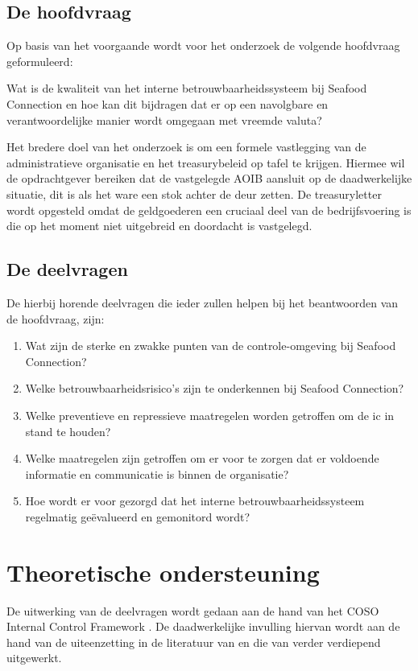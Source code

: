 \newpage

\subsection{De hoofdvraag}
Op basis van het voorgaande wordt voor het onderzoek de volgende hoofdvraag geformuleerd:

\bigskip

\noindent
\begin{center}
\textnormal{\large{Wat is de kwaliteit van het interne betrouwbaarheidssysteem bij Seafood Connection en hoe kan dit bijdragen dat er op een navolgbare en verantwoordelijke manier wordt omgegaan met vreemde valuta?}}
\end{center}

\bigskip

Het bredere doel van het onderzoek is om een formele vastlegging van de administratieve organisatie en het treasurybeleid op tafel te krijgen. Hiermee wil de opdrachtgever bereiken dat de vastgelegde AOIB aansluit op de daadwerkelijke situatie, dit is als het ware een stok achter de deur zetten. De \gls{treasuryletter} wordt opgesteld omdat de \gls{geldgoederen} een cruciaal deel van de bedrijfsvoering is die op het moment niet uitgebreid en doordacht is vastgelegd.
\subsection{De deelvragen}
De hierbij horende deelvragen die ieder zullen helpen bij het beantwoorden van de hoofdvraag, zijn:

\begin{enumerate}
    \item Wat zijn de sterke en zwakke punten van de controle-omgeving bij Seafood Connection?
    \item Welke betrouwbaarheidsrisico's zijn te onderkennen bij Seafood Connection?
    \item Welke preventieve en repressieve maatregelen worden getroffen om de \gls{ic} in stand te houden?
    \item Welke maatregelen zijn getroffen om er voor te zorgen dat er voldoende informatie en communicatie is binnen de organisatie?
    \item Hoe wordt er voor gezorgd dat het interne betrouwbaarheidssysteem regelmatig geëvalueerd en gemonitord wordt?
\end{enumerate}

\newpage
\section{Theoretische ondersteuning}
De uitwerking van de deelvragen wordt gedaan aan de hand van het COSO Internal Control Framework \citep{COSOsummery}. De daadwerkelijke invulling hiervan wordt aan de hand van de uiteenzetting in de literatuur van \citet{bivpraktijk} en die van \citet{bivperspectief} verder verdiepend uitgewerkt. 


